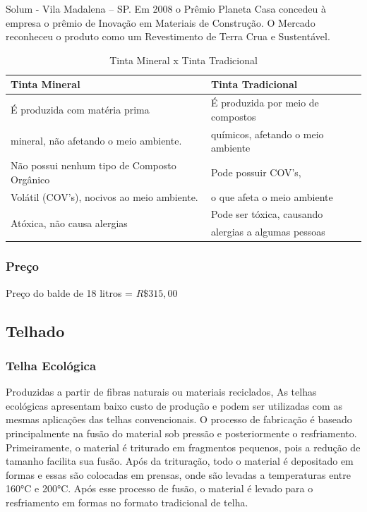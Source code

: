	Solum - Vila Madalena – SP. Em 2008 o Prêmio Planeta Casa concedeu à empresa o prêmio de Inovação em Materiais de Construção. O Mercado reconheceu o produto como um Revestimento de Terra Crua e Sustentável.  

\begin{table}[H]
\centering
\begin{tabular}{|l|l|}
\hline 
\textbf{Tinta Mineral} & \textbf{Tinta Tradicional}\tabularnewline
\hline 
\hline 
É produzida com matéria prima & É produzida por meio de compostos \tabularnewline
mineral, não afetando o meio ambiente. & químicos, afetando o meio ambiente\tabularnewline
\hline 
Não possui nenhum tipo de Composto Orgânico  & Pode possuir COV\textquoteright{}s, \tabularnewline
Volátil (COV\textquoteright{}s), nocivos ao meio ambiente. & o que afeta o meio ambiente\tabularnewline
\hline 
\multirow{2}{*}{Atóxica, não causa alergias} & Pode ser tóxica, causando\tabularnewline
 &  alergias a algumas pessoas\tabularnewline
\hline 
\end{tabular}
\caption{Tinta Mineral x Tinta Tradicional}
\end{table}


\subsubsection*{\textbf{Preço}}

	Preço do balde de 18 litros = $R\$ 315,00$

\subsection{Telhado}

\subsubsection*{\textbf{Telha Ecológica}}

	Produzidas a partir de fibras naturais ou materiais reciclados, As telhas ecológicas apresentam baixo custo de produção e podem ser utilizadas com as mesmas aplicações das telhas convencionais.
	O processo de fabricação é baseado principalmente na fusão do material sob pressão e posteriormente o resfriamento. Primeiramente, o material é triturado em fragmentos pequenos, pois a redução de tamanho facilita sua fusão. Após da trituração, todo o material é depositado em formas e essas são colocadas em prensas, onde são levadas a temperaturas entre 160\si{\celsius} e 200\si{\celsius}. Após esse processo de fusão, o material é levado para o resfriamento em formas no formato tradicional de telha.\cite{D.C.Araujo}

